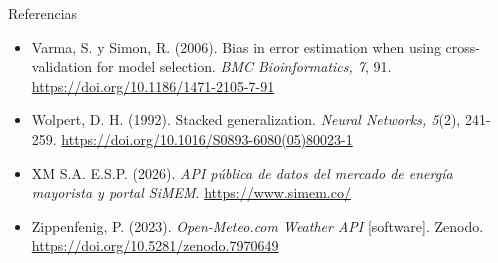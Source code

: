 \documentclass[aspectratio=169,10pt]{beamer}
\begin{document}
\begin{frame}[allowframebreaks]{Referencias}
\begin{itemize}
    \item Varma, S. y Simon, R. (2006). Bias in error estimation when using cross-validation for model selection. \textit{BMC Bioinformatics, 7}, 91. \url{https://doi.org/10.1186/1471-2105-7-91}
    \item Wolpert, D. H. (1992). Stacked generalization. \textit{Neural Networks, 5}(2), 241-259. \url{https://doi.org/10.1016/S0893-6080(05)80023-1}
    \item XM S.A. E.S.P. (2026). \textit{API pública de datos del mercado de energía mayorista y portal SiMEM}. \url{https://www.simem.co/}
    \item Zippenfenig, P. (2023). \textit{Open-Meteo.com Weather API} [software]. Zenodo. \url{https://doi.org/10.5281/zenodo.7970649}
  \end{itemize}
\end{frame}
\end{document}
